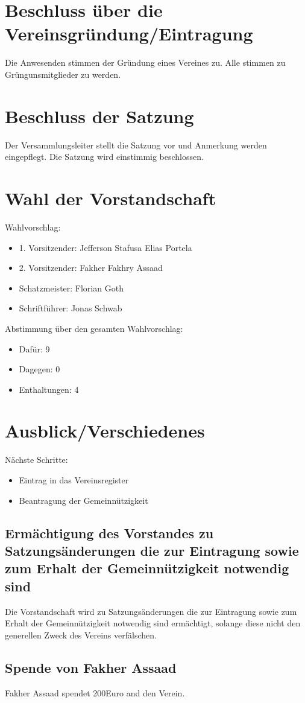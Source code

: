 \documentclass[a4paper,german,12pt]{scrartcl}
\begin{document}
\section{Beschluss über die Vereinsgründung/Eintragung}
Die Anwesenden stimmen der Gründung eines Vereines zu. Alle stimmen zu Grüngunsmitglieder zu werden.

\section{Beschluss der Satzung}
Der Versammlungsleiter stellt die Satzung vor und Anmerkung werden eingepflegt. Die Satzung wird einstimmig beschlossen.


\section{Wahl der Vorstandschaft}
Wahlvorschlag:
\begin{itemize}
\item 1. Vorsitzender: Jefferson Stafusa Elias Portela
\item 2. Vorsitzender: Fakher Fakhry Assaad
\item Schatzmeister: Florian Goth
\item Schriftführer: Jonas Schwab
\end{itemize}
Abstimmung über den gesamten Wahlvorschlag:
\begin{itemize}
\item Dafür: 9
\item Dagegen: 0
\item Enthaltungen: 4
\end{itemize}

\section{Ausblick/Verschiedenes}

Nächste Schritte:
\begin{itemize}
\item Eintrag in das Vereinsregister
\item Beantragung der Gemeinnützigkeit
\end{itemize}

\subsection{Ermächtigung des Vorstandes zu Satzungsänderungen die zur Eintragung sowie zum Erhalt der Gemeinnützigkeit notwendig sind}

Die Vorstandschaft wird zu Satzungsänderungen die zur Eintragung sowie zum Erhalt der Gemeinnützigkeit notwendig sind ermächtigt, solange diese nicht den generellen Zweck des Vereins verfälschen.

\subsection{Spende von Fakher Assaad}
Fakher Assaad spendet 200\;Euro and den Verein.


\end{document}
